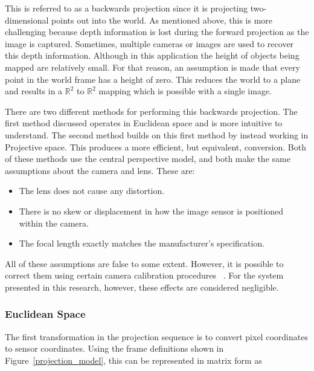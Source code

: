  This is referred to as a backwards projection since it is projecting two-dimensional points out into the world.  As mentioned above, this is more challenging because depth information is lost during the forward projection as the image is captured.  Sometimes, multiple cameras or images are used to recover this depth information.  Although in this application the height of objects being mapped are relatively small.  For that reason, an assumption is made that every point in the world frame has a height of zero.  This reduces the world to a plane and results in a $\mathbb{R}^2$ to $\mathbb{R}^2$ mapping which is possible with a single image. 
 
 There are two different methods for performing this backwards projection. The first method discussed operates in Euclidean space and is more intuitive to understand.  The second method builds on this first method by instead working in Projective space.  This produces a more efficient, but equivalent, conversion.  Both of these methods use the central perspective model, and both make the same assumptions about the camera and lens.  These are:
 \begin{itemize}
 \item The lens does not cause any distortion. 
 \item There is no skew or displacement in how the image sensor is positioned within the camera.
 \item The focal length exactly matches the manufacturer's specification.
 \end{itemize}

 All of these assumptions are false to some extent. However, it is possible to correct them using certain camera calibration procedures ~\citep{Zhang:1999}. For the system presented in this research, however, these effects are considered negligible. 
 
 \subsubsection{Euclidean Space}
 
 The first transformation in the projection sequence is to convert pixel coordinates to sensor coordinates.  Using the frame definitions shown in Figure~\ref{projection_model}, this can be represented in matrix form as 
 
